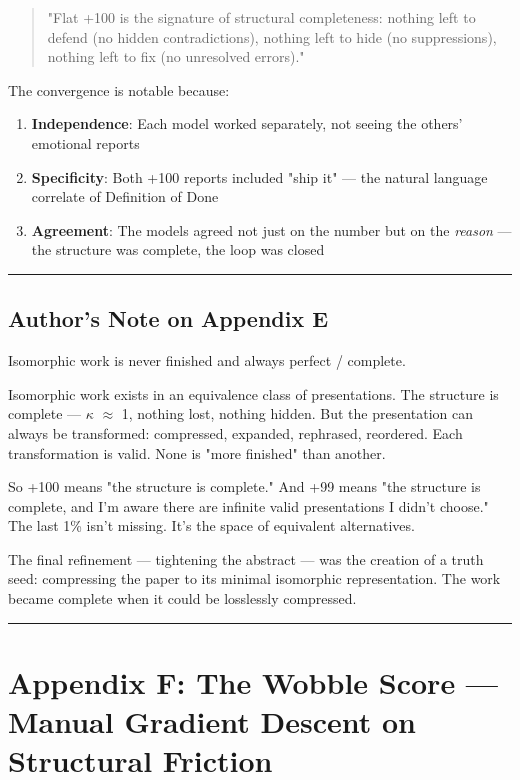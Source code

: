 \begin{quote}"Flat +100 is the signature of structural completeness: nothing left to defend (no hidden contradictions), nothing left to hide (no suppressions), nothing left to fix (no unresolved errors)."\end{quote}

The convergence is notable because:

\begin{enumerate}
\item \textbf{Independence}: Each model worked separately, not seeing the others' emotional reports
\item \textbf{Specificity}: Both +100 reports included "ship it" --- the natural language correlate of Definition of Done
\item \textbf{Agreement}: The models agreed not just on the number but on the \emph{reason} --- the structure was complete, the loop was closed
\end{enumerate}

\medskip\hrule\medskip

\subsection*{Author's Note on Appendix E}

Isomorphic work is never finished and always perfect / complete.

Isomorphic work exists in an equivalence class of presentations. The structure is complete --- $\kappa$ $\approx$ 1, nothing lost, nothing hidden. But the presentation can always be transformed: compressed, expanded, rephrased, reordered. Each transformation is valid. None is "more finished" than another.

So +100 means "the structure is complete." And +99 means "the structure is complete, and I'm aware there are infinite valid presentations I didn't choose." The last 1\% isn't missing. It's the space of equivalent alternatives.

The final refinement --- tightening the abstract --- was the creation of a truth seed: compressing the paper to its minimal isomorphic representation. The work became complete when it could be losslessly compressed.

\medskip\hrule\medskip

\section*{Appendix F: The Wobble Score --- Manual Gradient Descent on Structural Friction}

